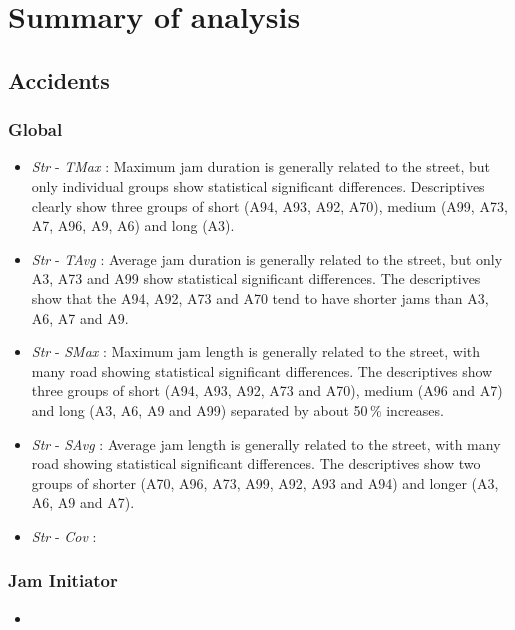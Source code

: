 \chapter{Summary of analysis}
\label{analysis_summary}


\section{Accidents}

\subsection{Global}

\begin{itemize}
    \item \textit{Str} - \textit{TMax} : Maximum jam duration is generally related to the street, but only individual groups show statistical significant differences. Descriptives clearly show three groups of short (A94, A93, A92, A70), medium (A99, A73, A7, A96, A9, A6) and long (A3).
    \item \textit{Str} - \textit{TAvg} : Average jam duration is generally related to the street, but only A3, A73 and A99 show statistical significant differences. The descriptives show that the A94, A92, A73 and A70 tend to have shorter jams than A3, A6, A7 and A9.
    \item \textit{Str} - \textit{SMax} : Maximum jam length is generally related to the street, with many road showing statistical significant differences. The descriptives show three groups of short (A94, A93, A92, A73 and A70), medium (A96 and A7) and long (A3, A6, A9 and A99) separated by about 50\,\% increases.
    \item \textit{Str} - \textit{SAvg} : Average jam length is generally related to the street, with many road showing statistical significant differences. The descriptives show two groups of shorter (A70, A96, A73, A99, A92, A93 and A94) and longer (A3, A6, A9 and A7).
    \item \textit{Str} - \textit{Cov} : 
\end{itemize}

\subsection{Jam Initiator}

\begin{itemize}
    \item 
\end{itemize}

